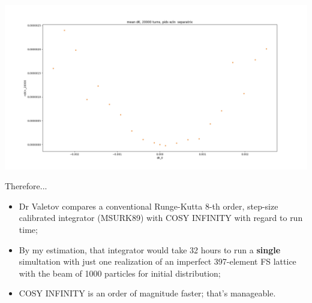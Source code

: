 \documentclass[pdf]{beamer}
\begin{document}
\begin{frame}
	\centering
	\includegraphics[scale=.3]{mean_dK_test_mean_dK_vs_dK0_20000trns_parabola}
\end{frame}
	
	\begin{frame}{Therefore...}
	\begin{itemize}
		\item Dr Valetov compares a conventional Runge-Kutta 8-th order, step-size calibrated integrator (MSURK89) with COSY INFINITY with regard to run time;
		\item By my estimation, that integrator would take 32 hours to run a \textbf{single} simultation with just one realization of an imperfect 397-element FS lattice with the beam of 1000 particles for initial distribution;
		\item COSY INFINITY is an order of magnitude faster; that's manageable.
	\end{itemize}
	\end{frame}
\end{document}
